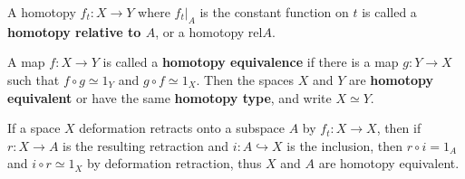 \begin{defn} A homotopy $f_t:X\rightarrow Y$ where $f_t|_A$ is the constant function on $t$ is called a \textbf{homotopy relative to $A$}, or a homotopy $\mathrm{rel} A$.
\end{defn}
\begin{defn} A map $f:X\rightarrow Y$ is called a \textbf{homotopy equivalence} if there is a map $g:Y\rightarrow X$ such that $f\circ g\simeq 1_Y$ and $g\circ f\simeq 1_X$. Then the spaces $X$ and $Y$ are \textbf{homotopy equivalent} or have the same \textbf{homotopy type}, and write $X\simeq Y$.
\end{defn}
\begin{exmp} If a space $X$ deformation retracts onto a subspace $A$ by $f_t:X\rightarrow X$, then if $r:X\rightarrow A$ is the resulting retraction and $i:A\hookrightarrow X$ is the inclusion, then $r\circ i=1_A$ and $i\circ r\simeq 1_X$ by deformation retraction, thus $X$ and $A$ are homotopy equivalent.
\end{exmp}

